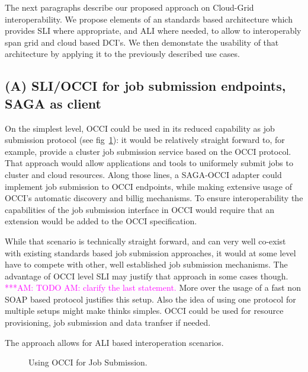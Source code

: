 \documentclass[10pt,conference,final,letterpaper,twoside,twocolumn,]{IEEEtran}
\newcommand{\amnote}[1]{  {\textcolor{magenta} {***AM: #1}}}
\newcommand{\amnote}[1]{}
\begin{document}
 The next paragraphs describe our proposed approach on Cloud-Grid
 interoperability.  We propose elements of an standards based
 architecture which provides  SLI where appropriate, and ALI where
 needed, to allow to interoperably span grid and cloud based DCI's.
 We then demonstate the usability of that architecture by applying it
 to the previously described use cases.


 \subsection{(A) SLI/OCCI for job submission endpoints, SAGA as client}

 On the simplest level, OCCI could be used in its reduced capability
 as job submission protocol (see fig~\ref{fig:arch1}): it would be
 relatively straight forward to, for example, provide a cluster job
 submission service based on the OCCI protocol. That approach would
 allow applications and tools to uniformely submit jobs to cluster and
 cloud resources.  Along those lines, a SAGA-OCCI adapter could
 implement job submission to OCCI endpoints, while making extensive
 usage of OCCI's automatic discovery and billig mechanisms. To ensure
 interoperability the capabilities of the job submission interface in
 OCCI would require that an extension would be added to the OCCI
 specification.

 While that scenario is technically straight forward, and can very
 well co-exist with existing standards based job submission
 approaches, it would at some level have to compete with other, well
 established job submission mechanisms.  The advantage of OCCI level
 SLI may justify that approach in some cases though.  \amnote{TODO AM:
 clarify the last statement.} More over the usage of a fast non SOAP
 based protocol justifies this setup. Also the idea of using one
 protocol for multiple setups might make thinks simples. OCCI could be
 used for resource provisioning, job submission and data tranfser if
 needed.

 The approach allows for ALI based interoperation scenarios.

\begin{figure}[htb]
 \caption{\label{fig:arch1} Using OCCI for Job Submission.}
\end{figure}
\end{document}

